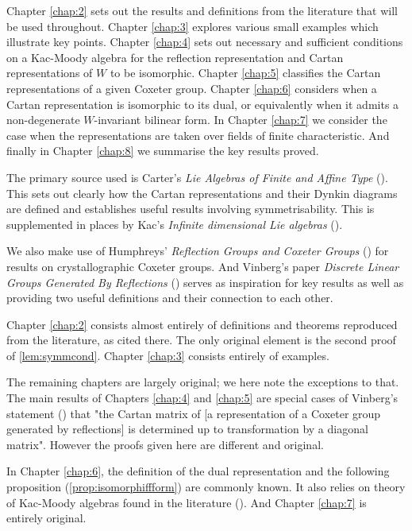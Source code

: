 \documentclass[11pt,a4paper]{report}
\theoremstyle{definition}
\begin{document}
Chapter \ref{chap:2} sets out the results and definitions from the literature that will be used throughout. Chapter \ref{chap:3} explores various small examples which illustrate key points. Chapter \ref{chap:4} sets out necessary and sufficient conditions on a Kac-Moody algebra for the reflection representation and Cartan representations of $W$ to be isomorphic. Chapter \ref{chap:5} classifies the Cartan representations of a given Coxeter group. Chapter \ref{chap:6} considers when a Cartan representation is isomorphic to its dual, or equivalently when it admits a non-degenerate $W$-invariant bilinear form. In Chapter \ref{chap:7} we consider the case when the representations are taken over fields of finite characteristic. And finally in Chapter \ref{chap:8} we summarise the key results proved. 

The primary source used is Carter's \emph{Lie Algebras of Finite and Affine Type} (\cite{Carter}). This sets out clearly how the Cartan representations and their Dynkin diagrams are defined and establishes useful results involving symmetrisability. This is supplemented in places by Kac's \emph{Infinite dimensional Lie algebras} (\cite{Kac}). 

We also make use of Humphreys' \emph{Reflection Groups and Coxeter Groups} (\cite{Humphreys}) for results on crystallographic Coxeter groups. And Vinberg's paper \emph{Discrete Linear Groups Generated By Reflections} (\cite{Vinberg}) serves as inspiration for key results as well as providing two useful definitions and their connection to each other. 

Chapter \ref{chap:2} consists almost entirely of definitions and theorems reproduced from the literature, as cited there. The only original element is the second proof of \ref{lem:symmcond}. Chapter \ref{chap:3} consists entirely of examples. 

The remaining chapters are largely original; we here note the exceptions to that. The main results of Chapters \ref{chap:4} and \ref{chap:5} are special cases of Vinberg's statement (\cite{Vinberg}) that "the Cartan matrix of [a representation of a Coxeter group generated by reflections] is determined up to transformation by a diagonal matrix". However the proofs given here are different and original.

In Chapter \ref{chap:6}, the definition of the dual representation and the following proposition (\ref{prop:isomorphiffform}) are commonly known. It also relies on theory of Kac-Moody algebras found in the literature (\cite{Carter}). And Chapter \ref{chap:7} is entirely original. 
\end{document}
